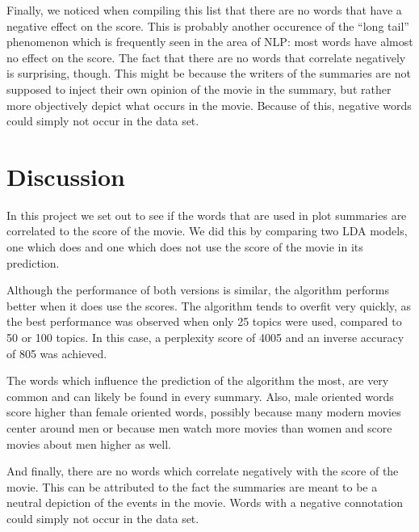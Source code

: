 \documentclass{article} %
\begin{document}
Finally, we noticed when compiling this list that there are no words that have a negative effect on the score.
This is probably another occurence of the ``long tail'' phenomenon which is frequently seen in the area of NLP: most words have almost no effect on the score.
The fact that there are no words that correlate negatively is surprising, though.
This might be because the writers of the summaries are not supposed to inject their own opinion of the movie in the summary, but rather more objectively depict what occurs in the movie.
Because of this, negative words could simply not occur in the data set.

\section{Discussion}
\label{sec:discussion}

In this project we set out to see if the words that are used in plot summaries are correlated to the score of the movie. 
We did this by comparing two LDA models, one which does and one which does not use the score of the movie in its prediction.

Although the performance of both versions is similar, the algorithm performs better when it does use the scores.
The algorithm tends to overfit very quickly, as the best performance was observed when only 25 topics were used, compared to 50 or 100 topics.
In this case, a perplexity score of 4005 and an inverse accuracy of 805 was achieved.

The words which influence the prediction of the algorithm the most, are very common and can likely be found in every summary. 
Also, male oriented words score higher than female oriented words, possibly because many modern movies center around men or because men watch more movies than women and score movies about men higher as well.

And finally, there are no words which correlate negatively with the score of the movie. 
This can be attributed to the fact the summaries are meant to be a neutral depiction of the events in the movie.
Words with a negative connotation could simply not occur in the data set.
\end{document}
